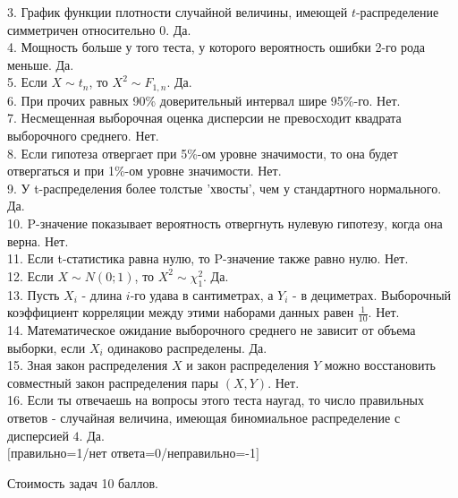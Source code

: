 \documentclass[pdftex,12pt,a4paper]{article}
\begin{document}
3. График функции плотности случайной величины, имеющей
$t$-распределение симметричен относительно 0. Да.  \\
4. Мощность больше у того теста, у которого вероятность ошибки
2-го рода меньше. Да.  \\

5. Если $X\sim t_{n}$, то $X^{2}\sim F_{1,n}$. Да.\\
6. При прочих равных 90\% доверительный интервал шире 95\%-го.  Нет. \\
7. Несмещенная выборочная оценка дисперсии не превосходит квадрата
выборочного среднего. Нет. \\

8. Если гипотеза отвергает при 5\%-ом уровне значимости, то она
будет отвергаться и при 1\%-ом уровне значимости. Нет. \\

9. У t-распределения более толстые 'хвосты', чем у стандартного
нормального. Да.  \\

10. P-значение показывает вероятность отвергнуть нулевую гипотезу,
когда она верна. Нет. \\

11. Если t-статистика равна нулю, то P-значение также равно нулю.
 Нет.
\\

12. Если $X\sim N(0;1)$, то $X^{2}\sim \chi_{1}^{2}$. Да.  \\

13. Пусть $X_{i}$ - длина $i$-го удава в сантиметрах, а $Y_{i}$ -
в дециметрах. Выборочный коэффициент корреляции между этими
наборами данных равен $\frac{1}{10}$. Нет. \\

14. Математическое ожидание выборочного среднего не зависит от
объема выборки, если $X_{i}$ одинаково распределены. Да. \\

15. Зная закон распределения $X$ и закон распределения $Y$
можно восстановить совместный закон распределения пары $(X,Y)$. Нет. \\

16. Если ты отвечаешь на вопросы этого теста наугад, то число
правильных ответов - случайная величина, имеющая биномиальное
распределение с дисперсией $4$. Да. \\
$[$правильно=1/нет ответа=0/неправильно=-1$]$



 Стоимость задач 10 баллов.
\end{document}
